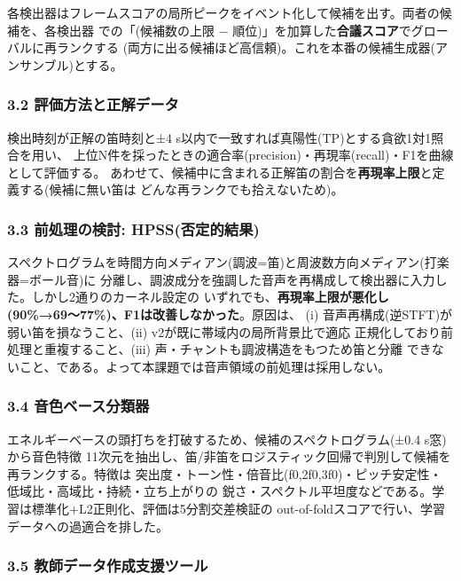 \documentclass[
  japanese,
]{ltjsarticle}
\begin{document}
各検出器はフレームスコアの局所ピークをイベント化して候補を出す。両者の候補を、各検出器
での「(候補数の上限 −
順位)」を加算した\textbf{合議スコア}でグローバルに再ランクする
(両方に出る候補ほど高信頼)。これを本番の候補生成器(アンサンブル)とする。

\subsubsection{3.2
評価方法と正解データ}\label{ux8a55ux4fa1ux65b9ux6cd5ux3068ux6b63ux89e3ux30c7ux30fcux30bf}

検出時刻が正解の笛時刻と±4
s以内で一致すれば真陽性(TP)とする貪欲1対1照合を用い、
上位N件を採ったときの適合率(precision)・再現率(recall)・F1を曲線として評価する。
あわせて、候補中に含まれる正解笛の割合を\textbf{再現率上限}と定義する(候補に無い笛は
どんな再ランクでも拾えないため)。

\subsubsection{3.3 前処理の検討:
HPSS(否定的結果)}\label{ux524dux51e6ux7406ux306eux691cux8a0e-hpssux5426ux5b9aux7684ux7d50ux679c}

スペクトログラムを時間方向メディアン(調波=笛)と周波数方向メディアン(打楽器=ボール音)に
分離し、調波成分を強調した音声を再構成して検出器に入力した。しかし2通りのカーネル設定の
いずれでも、\textbf{再現率上限が悪化し(90\%→69〜77\%)、F1は改善しなかった}。原因は、
(i) 音声再構成(逆STFT)が弱い笛を損なうこと、(ii)
v2が既に帯域内の局所背景比で適応
正規化しており前処理と重複すること、(iii)
声・チャントも調波構造をもつため笛と分離
できないこと、である。よって本課題では音声領域の前処理は採用しない。

\subsubsection{3.4
音色ベース分類器}\label{ux97f3ux8272ux30d9ux30fcux30b9ux5206ux985eux5668}

エネルギーベースの頭打ちを打破するため、候補のスペクトログラム(±0.4
s窓)から音色特徴
11次元を抽出し、笛/非笛をロジスティック回帰で判別して候補を再ランクする。特徴は
突出度・トーン性・倍音比(f0,2f0,3f0)・ピッチ安定性・低域比・高域比・持続・立ち上がりの
鋭さ・スペクトル平坦度などである。学習は標準化+L2正則化、評価は5分割交差検証の
out-of-foldスコアで行い、学習データへの過適合を排した。

\subsubsection{3.5
教師データ作成支援ツール}\label{ux6559ux5e2bux30c7ux30fcux30bfux4f5cux6210ux652fux63f4ux30c4ux30fcux30eb}
\end{document}
